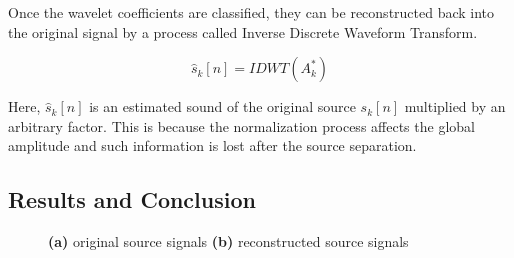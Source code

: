 \documentclass[a4paper,11pt]{article}
\begin{document}
\noindent Once the wavelet coefficients are classified, they can be reconstructed back into the original signal by a process called Inverse Discrete Waveform Transform.

\begin{equation}
    \hat{s}_k[n] = IDWT(A^*_k)
\end{equation}

\noindent Here, $\hat{s}_k[n]$ is an estimated sound of the original source $s_k[n]$ multiplied by an arbitrary factor. This is because the normalization process affects the global amplitude and such information is lost after the source separation.







\subsection{Results and Conclusion}
\begin{figure}[H]
\centering
{}
\centering
{}
\caption{\textbf{(a)} original source signals  \; \textbf{(b)} reconstructed source signals }
\end{figure}
\end{document}
